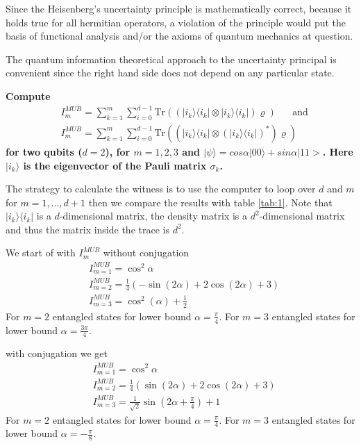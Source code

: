 \documentclass[a4paper]{article}
\newcounter{exercise}
\newenvironment{MyExercise}%
{\begin{mdframed}[style=exercisestyle]}{\end{mdframed}}
\begin{document}
\begin{MyExercise}
    Since the Heisenberg's uncertainty principle is mathematically correct,
    because it holds true for all hermitian operators, a violation of
    the principle would put the basis of functional analysis and/or
    the axioms of quantum mechanics at question.

    The quantum information theoretical approach to the uncertainty principal
    is convenient since the right hand side does not depend on any particular
    state.
\end{MyExercise}

\begin{MyExercise}\label{ex:2}
    \textbf{Compute
    \begin{align}
        &I_m^{MUB} = \sum_{k=1}^m\sum_{i=0}^{d-1}
        \text{Tr}((|i_k\rangle\langle i_k| \otimes |i_k\rangle \langle i_k|)
        \varrho) \;\;\;\;\;\; \text{and}\\
        &I_m^{MUB} = \sum_{k=1}^m\sum_{i=0}^{d-1}
        \text{Tr}((|i_k\rangle\langle i_k| \otimes  (|i_k\rangle \langle
        i_k|)^*)
        \varrho)
    \end{align}
    for two qubits ($d=2$), for $m=1, 2, 3$ and $|\psi\rangle =
    cos\alpha|00\rangle + sin\alpha |11>$. Here $|i_k\rangle$ is the eigenvector
    of the Pauli matrix $\sigma_k$.}

    The strategy to calculate the witness is to use the computer to loop over
    $d$ and $m$ for $m = 1, \dots, d+1$ then we compare the results with table
    \ref{tab:1}. Note that $|i_k\rangle\langle i_k|$ is a $d$-dimensional
    matrix, the density matrix is a $d^2$-dimensional matrix and
    thus the matrix inside the trace is $d^2$.

    We start of with $I_m^{MUB}$ without conjugation
    \begin{align}
        &I^{MUB}_{m=1} = \cos^2\alpha\\
        &I^{MUB}_{m=2} = \frac{1}{4}(-\sin(2\alpha) + 2\cos(2\alpha) + 3)\\
        &I^{MUB}_{m=3} = \cos^2(\alpha) + \frac{1}{2}
    \end{align}
    For $m=2$ entangled states for lower bound $\alpha = \frac{\pi}{4}$. For
    $m = 3$ entangled states for lower bound $\alpha = \frac{3\pi}{4}$.

    with conjugation we get
    \begin{align}
        &I^{MUB}_{m=1} = \cos^2\alpha\\
        &I^{MUB}_{m=2} = \frac{1}{4}(\sin(2\alpha) + 2\cos(2\alpha) + 3)\\
        &I^{MUB}_{m=3} = \frac{1}{\sqrt{2}} \sin(2\alpha + \frac{\pi}{4}) +1
    \end{align}
    For $m=2$ entangled states for lower bound $\alpha = \frac{\pi}{4}$. For
    $m = 3$ entangled states for lower bound $\alpha = -\frac{\pi}{8}$.
\end{MyExercise}
\end{document}
